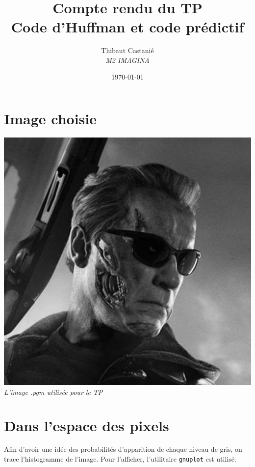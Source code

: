 \documentclass[a4paper,11pt]{article}
\begin{document}
\title{\textbf{Compte rendu du TP }\\Code d'Huffman et code prédictif}
\author{Thibaut Castanié\\\textit{M2 IMAGINA}}
\date{\today}

\maketitle
\thispagestyle{empty}

\newpage 

\section{Image choisie}

\begin{center}
\includegraphics[scale=0.5]{./terminator.png}\\
\textit{L'image .pgm utilisée pour le TP}
\end{center}


\section{Dans l'espace des pixels}

Afin d'avoir une idée des probabilités d'apparition de chaque niveau de gris, on trace l'histogramme de l'image. Pour l'afficher, l'utilitaire \texttt{gnuplot} est utilisé.
\end{document}
